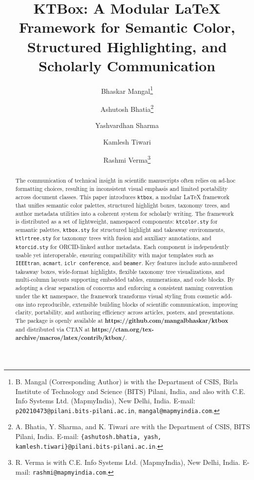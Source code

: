\documentclass[12pt,onecolumn]{article}
\date{} %
\begin{document}
\title{KTBox: A Modular LaTeX Framework for Semantic Color, Structured Highlighting, and Scholarly Communication}


\author{%
  Bhaskar Mangal\thanks{B. Mangal (Corresponding Author) is with the Department of CSIS, Birla Institute of Technology and Science (BITS) Pilani, India, and also with C.E. Info Systems Ltd. (MapmyIndia), New Delhi, India. E-mail: \texttt{p20210473@pilani.bits-pilani.ac.in}, \texttt{mangal@mapmyindia.com}.}%
  \and
  Ashutosh Bhatia\thanks{A. Bhatia, Y. Sharma, and K. Tiwari are with the Department of CSIS, BITS Pilani, India. E-mail: \texttt{\{ashutosh.bhatia, yash, kamlesh.tiwari\}@pilani.bits-pilani.ac.in}.}%
  \and
  Yashvardhan Sharma%
  \and
  Kamlesh Tiwari%
  \and
  Rashmi Verma\thanks{R. Verma is with C.E. Info Systems Ltd. (MapmyIndia), New Delhi, India. E-mail: \texttt{rashmi@mapmyindia.com}.}%
}


  \maketitle

  \begin{abstract}
The communication of technical insight in scientific manuscripts often relies on ad-hoc formatting choices, resulting in inconsistent visual emphasis and limited portability across document classes. This paper introduces \texttt{ktbox}, a modular \LaTeX{} framework that unifies semantic color palettes, structured highlight boxes, taxonomy trees, and author metadata utilities into a coherent system for scholarly writing. The framework is distributed as a set of lightweight, namespaced components: \texttt{ktcolor.sty} for semantic palettes, \texttt{ktbox.sty} for structured highlight and takeaway environments, \texttt{ktlrtree.sty} for taxonomy trees with fusion and auxiliary annotations, and \texttt{ktorcid.sty} for ORCID-linked author metadata. Each component is independently usable yet interoperable, ensuring compatibility with major templates such as \texttt{IEEEtran}, \texttt{acmart}, \texttt{iclr conference}, and \texttt{beamer}. Key features include auto-numbered takeaway boxes, wide-format highlights, flexible taxonomy tree visualizations, and multi-column layouts supporting embedded tables, enumerations, and code blocks. By adopting a clear separation of concerns and enforcing a consistent naming convention under the \texttt{kt} namespace, the framework transforms visual styling from cosmetic add-ons into reproducible, extensible building blocks of scientific communication, improving clarity, portability, and authoring efficiency across articles, posters, and presentations. The package is openly available at \textbf{https://github.com/mangalbhaskar/ktbox} and distributed via CTAN at \textbf{https://ctan.org/tex-archive/macros/latex/contrib/ktbox/}.

  \end{abstract}
\end{document}

